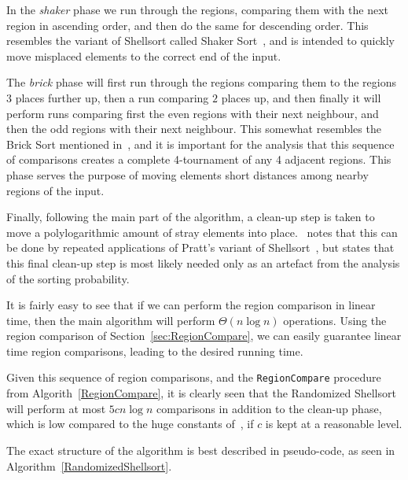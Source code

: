 In the \emph{shaker} phase we run through the regions, comparing them with the next region in ascending order, and then do the same for descending order. This resembles the variant of Shellsort called Shaker Sort~, and is intended to quickly move misplaced elements to the correct end of the input.

The \emph{brick} phase will first run through the regions comparing them to the regions $3$ places further up, then a run comparing $2$ places up, and then finally it will perform runs comparing first the even regions with their next neighbour, and then the odd regions with their next neighbour.
This somewhat resembles the Brick Sort mentioned in~, and it is important for the analysis that this sequence of comparisons creates a complete 4-tournament of any 4 adjacent regions.
This phase serves the purpose of moving elements short distances among nearby regions of the input. 

Finally, following the main part of the algorithm, a clean-up step is taken to move a polylogarithmic amount of stray elements into place.~ notes that this can be done by repeated applications of Pratt's variant of Shellsort~, but states that this final clean-up step is most likely needed only as an artefact from the analysis of the sorting probability.

It is fairly easy to see that if we can perform the region comparison in linear time, then the main algorithm will perform $\Theta(n \log n)$ operations. Using the region comparison of Section~\ref{sec:RegionCompare}, we can easily guarantee linear time region comparisons, leading to the desired running time. 

Given this sequence of region comparisons, and the \texttt{RegionCompare} procedure from Algorith~\ref{RegionCompare}, it is clearly seen that the Randomized Shellsort will perform at most $5cn\log n$ comparisons in addition to the clean-up phase, which is low compared to the huge constants of~, if $c$ is kept at a reasonable level.

The exact structure of the algorithm is best described in pseudo-code, as seen in Algorithm~\ref{RandomizedShellsort}.

